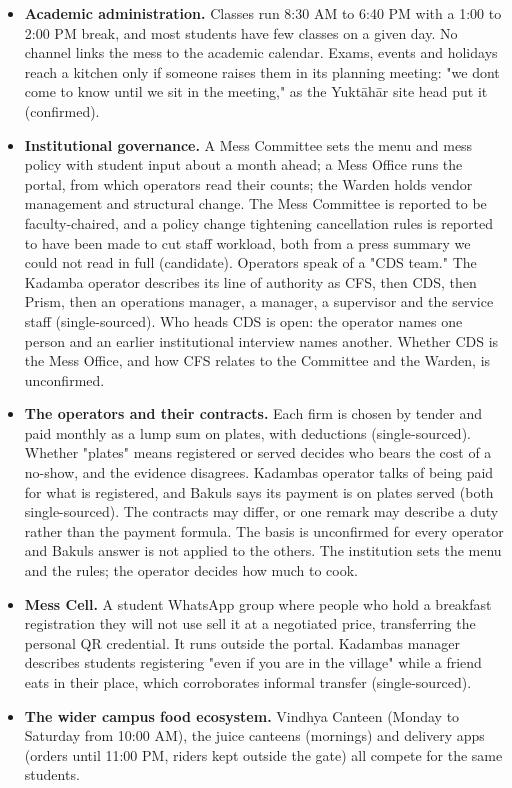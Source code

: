 \documentclass[
  10pt,
  table]{article}
\providecommand{\tightlist}{%
  \setlength{\itemsep}{0pt}\setlength{\parskip}{0pt}}
\renewcommand{\tightlist}{\setlength{\itemsep}{1.5pt}\setlength{\parskip}{0pt}}
\begin{document}
\begin{itemize}
\tightlist
\item
  \textbf{Academic administration.} Classes run 8:30 AM to 6:40 PM with a 1:00 to 2:00 PM break, and most students have few classes on a given day. No channel links the mess to the academic calendar. Exams, events and holidays reach a kitchen only if someone raises them in its planning meeting: "we don\textquotesingle t come to know until we sit in the meeting," as the Yuktāhār site head put it (confirmed).
\item
  \textbf{Institutional governance.} A Mess Committee sets the menu and mess policy with student input about a month ahead; a Mess Office runs the portal, from which operators read their counts; the Warden holds vendor management and structural change. The Mess Committee is reported to be faculty-chaired, and a policy change tightening cancellation rules is reported to have been made to cut staff workload, both from a press summary we could not read in full (candidate). Operators speak of a "CDS team." The Kadamba operator describes its line of authority as CFS, then CDS, then Prism, then an operations manager, a manager, a supervisor and the service staff (single-sourced). Who heads CDS is open: the operator names one person and an earlier institutional interview names another. Whether CDS is the Mess Office, and how CFS relates to the Committee and the Warden, is unconfirmed.
\item
  \textbf{The operators and their contracts.} Each firm is chosen by tender and paid monthly as a lump sum on plates, with deductions (single-sourced). Whether "plates" means registered or served decides who bears the cost of a no-show, and the evidence disagrees. Kadamba\textquotesingle s operator talks of being paid for what is registered, and Bakul\textquotesingle s says its payment is on plates served (both single-sourced). The contracts may differ, or one remark may describe a duty rather than the payment formula. The basis is unconfirmed for every operator and Bakul\textquotesingle s answer is not applied to the others. The institution sets the menu and the rules; the operator decides how much to cook.
\item
  \textbf{Mess Cell.} A student WhatsApp group where people who hold a breakfast registration they will not use sell it at a negotiated price, transferring the personal QR credential. It runs outside the portal. Kadamba\textquotesingle s manager describes students registering "even if you are in the village" while a friend eats in their place, which corroborates informal transfer (single-sourced).
\item
  \textbf{The wider campus food ecosystem.} Vindhya Canteen (Monday to Saturday from 10:00 AM), the juice canteens (mornings) and delivery apps (orders until 11:00 PM, riders kept outside the gate) all compete for the same students.
\end{itemize}
\end{document}
